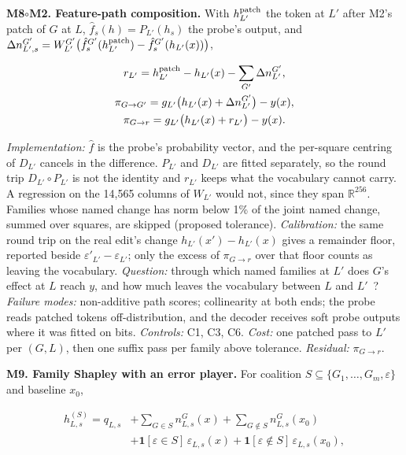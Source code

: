 \documentclass[conference]{IEEEtran}
\begin{document}
\textbf{M8$\circ$M2. Feature-path composition.} With $h^{\rm patch}_{L'}$ the token at $L'$ after M2's patch of $G$ at $L$, $\hat f_s(h)=P_{L'}(h_s)$ the probe's output, and $\Delta n^{G'}_{L',s}=W^{G'}_{L'}\big(\hat f^{G'}_s(h^{\rm patch}_{L'})-\hat f^{G'}_s(h_{L'}(x))\big)$,

\[
\begin{gathered}r_{L'}=h^{\rm patch}_{L'}-h_{L'}(x)-\sum_{G'}\Delta n^{G'}_{L'},\\
\pi_{G\to G'}=g_{L'}\big(h_{L'}(x)+\Delta n^{G'}_{L'}\big)-y(x),\\
\pi_{G\to r}=g_{L'}\big(h_{L'}(x)+r_{L'}\big)-y(x).\end{gathered}
\]

\emph{Implementation:} $\hat f$ is the probe's probability vector, and the per-square centring of $D_{L'}$ cancels in the difference. $P_{L'}$ and $D_{L'}$ are fitted separately, so the round trip $D_{L'}\circ P_{L'}$ is not the identity and $r_{L'}$ keeps what the vocabulary cannot carry. A regression on the 14,565 columns of $W_{L'}$ would not, since they span $\mathbb R^{256}$. Families whose named change has norm below 1\% of the joint named change, summed over squares, are skipped (proposed tolerance). \emph{Calibration:} the same round trip on the real edit's change $h_{L'}(x')-h_{L'}(x)$ gives a remainder floor, reported beside $\varepsilon'_{L'}-\varepsilon_{L'}$; only the excess of $\pi_{G\to r}$ over that floor counts as leaving the vocabulary. \emph{Question:} through which named families at $L'$ does $G$'s effect at $L$ reach $y$, and how much leaves the vocabulary between $L$ and $L'$~\cite{goldowsky2023}? \emph{Failure modes:} non-additive path scores; collinearity at both ends; the probe reads patched tokens off-distribution, and the decoder receives soft probe outputs where it was fitted on bits. \emph{Controls:} C1, C3, C6. \emph{Cost:} one patched pass to $L'$ per $(G,L)$, then one suffix pass per family above tolerance. \emph{Residual:} $\pi_{G\to r}$.

\textbf{M9. Family Shapley with an error player.} For coalition $S\subseteq\{G_1,\dots,G_m,\varepsilon\}$ and baseline $x_0$,

\[
\begin{aligned}h^{(S)}_{L,s}=q_{L,s}&+\sum_{G\in S}n^G_{L,s}(x)+\sum_{G\notin S}n^G_{L,s}(x_0)\\
&+\mathbf 1[\varepsilon\in S]\,\varepsilon_{L,s}(x)+\mathbf 1[\varepsilon\notin S]\,\varepsilon_{L,s}(x_0),\end{aligned}
\]
\end{document}
